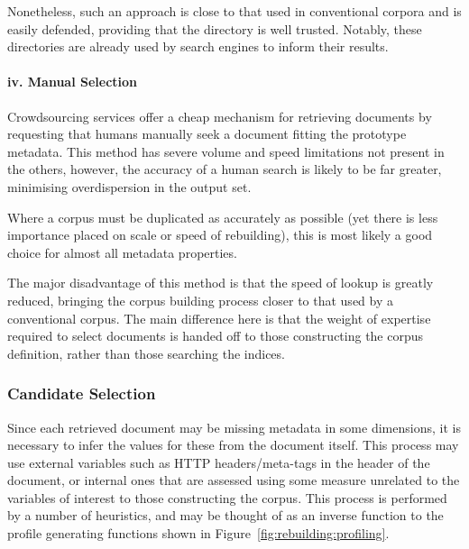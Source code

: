 Nonetheless, such an approach is close to that used in conventional corpora and is easily defended, providing that the directory is well trusted.  Notably, these directories are already used by search engines to inform their results\cite{sloanpaul2007}.%

\paragraph{iv. Manual Selection}
Crowdsourcing services offer a cheap mechanism for retrieving documents by requesting that humans manually seek a document fitting the prototype metadata.  This method has severe volume and speed limitations not present in the others, however, the accuracy of a human search is likely to be far greater, minimising overdispersion in the output set.

Where a corpus must be duplicated as accurately as possible (yet there is less importance placed on scale or speed of rebuilding), this is most likely a good choice for almost all metadata properties.

The major disadvantage of this method is that the speed of lookup is greatly reduced, bringing the corpus building process closer to that used by a conventional corpus.  The main difference here is that the weight of expertise required to select documents is handed off to those constructing the corpus definition, rather than those searching the indices.





\subsubsection{Candidate Selection}

Since each retrieved document may be missing metadata in some dimensions, it is necessary to infer the values for these from the document itself.  This process may use external variables such as HTTP headers/meta-tags in the header of the document, or internal ones that are assessed using some measure unrelated to the variables of interest to those constructing the corpus.  This process is performed by a number of heuristics, and may be thought of as an inverse function to the profile generating functions shown in Figure~\ref{fig:rebuilding:profiling}.

